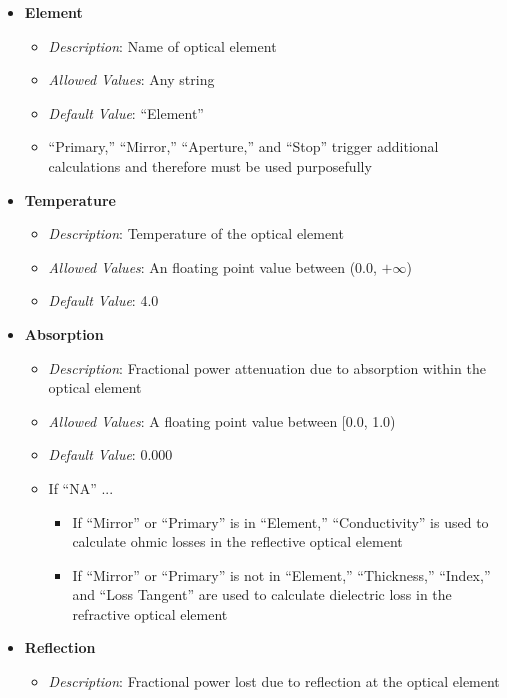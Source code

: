 \documentclass[11pt]{article} %
\begin{document}
\begin{itemize}[noitemsep,topsep=0pt]
	\item \textbf{Element}
		\begin{itemize}[noitemsep,topsep=0pt]
		\item \textit{Description}: Name of optical element
		\item \textit{Allowed Values}: Any string
		\item \textit{Default Value}: ``Element''
		\item ``Primary,'' ``Mirror,'' ``Aperture,'' and ``Stop'' trigger additional calculations and therefore must be used purposefully
		\end{itemize}
	\item \textbf{Temperature}
		\begin{itemize}[noitemsep,topsep=0pt]
		\item \textit{Description}: Temperature of the optical element
		\item \textit{Allowed Values}: An floating point value between (0.0, $+\infty$)
		\item \textit{Default Value}: 4.0
		\end{itemize}
	\item \textbf{Absorption}
		\begin{itemize}[noitemsep,topsep=0pt]
		\item \textit{Description}: Fractional power attenuation due to absorption within the optical element 
		\item \textit{Allowed Values}: A floating point value between [0.0, 1.0)
		\item \textit{Default Value}: 0.000
		\item If ``NA'' ...
			\begin{itemize}[noitemsep,topsep=0pt]
			\item If ``Mirror'' or ``Primary'' is in ``Element,'' ``Conductivity'' is used to calculate ohmic losses in the reflective optical element
			\item If ``Mirror'' or ``Primary'' is not in ``Element,'' ``Thickness,'' ``Index,'' and ``Loss Tangent'' are used to calculate dielectric loss in the refractive optical element
			\end{itemize}
		\end{itemize}
	\item \textbf{Reflection}
		\begin{itemize}[noitemsep,topsep=0pt]
		\item \textit{Description}: Fractional power lost due to reflection at the optical element 

\end{itemize}
\end{itemize}
\end{document}
